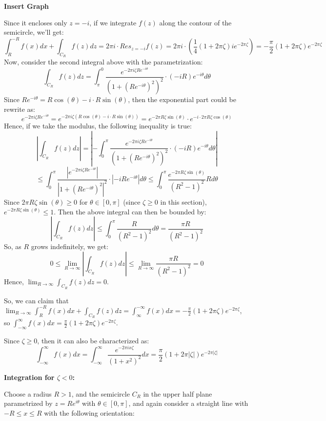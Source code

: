 \documentclass{article}
\begin{document}
\textbf{Insert Graph}

Since it encloses only $z=-i$, if we integrate $f(z)$ along the contour of the semicircle, we'll get:
$$\int_{R}^{-R}f(x)dx + \int_{C_R}f(z)dz = 2\pi i \cdot Res_{z=-i}f(z) = 2\pi i\cdot (\frac{1}{4}(1+2\pi\zeta)ie^{-2\pi\zeta}) = -\frac{\pi}{2}(1+2\pi\zeta)e^{-2\pi\zeta}$$
Now, consider the second integral above with the parametrization:
$$\int_{C_R}f(z)dz = \int_{\pi}^{0}\frac{e^{-2\pi i\zeta Re^{-i\theta}}}{(1+(Re^{-i\theta})^2)^2}\cdot (-iR)e^{-i\theta}d\theta$$
Since $Re^{-i\theta}=R\cos(\theta)-i\cdot R\sin(\theta)$, then the exponential part could be rewrite as:
$$e^{-2\pi i\zeta Re^{-i\theta}} = e^{-2\pi i\zeta (R\cos(\theta)-i\cdot R\sin(\theta))} = e^{-2\pi R\zeta\sin(\theta)}\cdot e^{-i\cdot 2\pi R\zeta\cos(\theta)}$$
Hence, if we take the modulus, the following inequality is true:
$$\left|\int_{C_R}f(z)dz\right| = \left|-\int_{0}^{\pi}\frac{e^{-2\pi i\zeta Re^{-i\theta}}}{(1+(Re^{-i\theta})^2)^2}\cdot (-iR)e^{-i\theta}d\theta\right|$$
$$\leq \int_{0}^{\pi}\frac{|e^{-2\pi i\zeta Re^{-i\theta}}|}{|1+(Re^{-i\theta})^2|^2}\cdot|-iRe^{-i\theta}|d\theta \leq \int_{0}^{\pi}\frac{e^{-2\pi R\zeta \sin(\theta)}}{(R^2-1)^2}R d\theta$$
Since $2\pi R\zeta\sin(\theta)\geq 0$ for $\theta\in [0,\pi]$ (since $\zeta\geq 0$ in this section), $e^{-2\pi R\zeta\sin(\theta)}\leq 1$. Then the above integral can then be bounded by:
$$\left|\int_{C_R}f(z)dz\right|\leq \int_{0}^{\pi}\frac{R}{(R^2-1)^2}d\theta = \frac{\pi R}{(R^2-1)^2}$$
So, as $R$ grows indefinitely, we get:
$$0\leq \lim_{R\rightarrow\infty}\left|\int_{C_R}f(z)dz\right|\leq \lim_{R\rightarrow\infty}\frac{\pi R}{(R^2-1)^2}=0$$
Hence, $\lim_{R\rightarrow\infty}\int_{C_R}f(z)dz=0$.

So, we can claim that $\lim_{R\rightarrow\infty}\int_{R}^{-R}f(x)dx + \int_{C_R}f(z)dz = \int_{\infty}^{-\infty}f(x)dx = -\frac{\pi}{2}(1+2\pi\zeta)e^{-2\pi\zeta}$, so $\int_{-\infty}^{\infty}f(x)dx = \frac{\pi}{2}(1+2\pi\zeta)e^{-2\pi\zeta}$.

Since $\zeta\geq 0$, then it can also be characterized as:
$$\int_{-\infty}^{\infty}f(x)dx = \int_{-\infty}^{\infty}\frac{e^{-2\pi ix\zeta}}{(1+x^2)^2}dx = \frac{\pi}{2}(1+2\pi|\zeta|)e^{-2\pi|\zeta|}$$

\hfil

\textbf{Integration for $\zeta<0$:}

Choose a radius $R>1$, and the semicircle $C_R$ in the upper half plane parametrized by $z=Re^{i\theta}$ with $\theta\in [0,\pi]$, and again consider a straight line with $-R\leq x\leq R$ with the following orientation:
\end{document}
